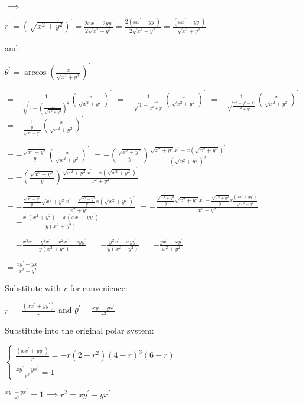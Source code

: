 \documentclass{article}
\begin{document}
$\implies$

$r^\prime = \left(  \sqrt{x^2+y^2}\right)^\prime =
\frac{2xx^\prime+2yy^\prime}{2\sqrt{x^2+y^2}} =
\frac{2(xx^\prime+yy^\prime)}{2\sqrt{x^2+y^2}} = \frac{(xx^\prime+yy^\prime)}{\sqrt{x^2+y^2}} $

and

$\theta^\prime = \arccos\left(\frac{x}{\sqrt{x^2+y^2}}\right)^\prime$

$=
-\frac{1}{ \sqrt{1-\left(\frac{x}{\sqrt{x^2+y^2}}\right)^2}}\left(\frac{x}{\sqrt{x^2+y^2}}\right)^\prime$
$=-\frac{1}{
  \sqrt{1-\frac{x^2}{x^2+y^2}}}\left(\frac{x}{\sqrt{x^2+y^2}}\right)^\prime$
$= -\frac{1}{
  \sqrt{\frac{x^2+y^2-x^2}{x^2+y^2}}}\left(\frac{x}{\sqrt{x^2+y^2}}\right)^\prime$
$=
-\frac{1}{\frac{y}{\sqrt{x^2+y^2}}}\left(\frac{x}{\sqrt{x^2+y^2}}\right)^\prime$

$=
-\frac{\sqrt{x^2+y^2}}{y}\left(\frac{x}{\sqrt{x^2+y^2}}\right)^\prime$
$= -\left(\frac{\sqrt{x^2+y^2}}{y}\right) \frac{\sqrt{x^2+y^2}
  x^\prime - x (\sqrt{x^2+y^2})^\prime}{(\sqrt{x^2+y^2})^2}$
$= -\left(\frac{\sqrt{x^2+y^2}}{y}\right) \frac{\sqrt{x^2+y^2}
  x^\prime - x (\sqrt{x^2+y^2})^\prime}{x^2+y^2}$

$= -\frac{\frac{\sqrt{x^2+y^2}}{y} \sqrt{x^2+y^2} x^\prime -
  \frac{\sqrt{x^2+y^2}}{y} x (\sqrt{x^2+y^2})^\prime}{x^2+y^2}$
$= -\frac{\frac{\sqrt{x^2+y^2}}{y} \sqrt{x^2+y^2} x^\prime -
  \frac{\sqrt{x^2+y^2}}{y} x \frac{(xx^\prime+yy^\prime)}{\sqrt{x^2+y^2}}}{x^2+y^2}$
$= -\frac{x^\prime(x^2+y^2) - x (xx^\prime+yy^\prime)}{y(x^2+y^2)}$

$= -\frac{x^2x^\prime+y^2x^\prime -
  x^2x^\prime-xyy^\prime}{y(x^2+y^2)}$
$= -\frac{y^2x^\prime -xyy^\prime}{y(x^2+y^2)}$
$= -\frac{yx^\prime -xy^\prime}{x^2+y^2}$

$= \frac{xy^\prime -yx^\prime}{x^2+y^2}$

\newpage

Substitute with $r$ for convenience:

$r^\prime = \frac{(xx^\prime+yy^\prime)}{r}$ and $\theta^\prime =
\frac{xy^\prime -yx^\prime}{r^2}$

Substitute into the original polar system:

$\begin{cases}\frac{(xx^\prime+yy^\prime)}{r}
=
-r(2-r^2)
(4-r)^3(6-r)\\  \frac{xy^\prime -yx^\prime}{r^2} = 1\end{cases}$

$\frac{xy^\prime -yx^\prime}{r^2} = 1 \implies r^2 = xy^\prime -yx^\prime$
\end{document}
